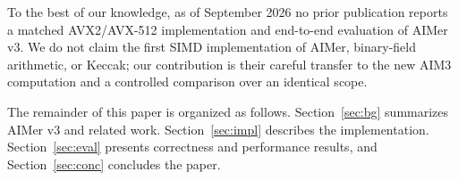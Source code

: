To the best of our knowledge, as of September 2026 no prior publication
reports a matched AVX2/AVX-512 implementation and end-to-end evaluation of
AIMer v3.  We do not claim the first SIMD implementation of AIMer, binary-field
arithmetic, or Keccak; our contribution is their careful transfer to the new
AIM3 computation and a controlled comparison over an identical scope.

The remainder of this paper is organized as follows.  Section~\ref{sec:bg}
summarizes AIMer v3 and related work.  Section~\ref{sec:impl} describes the
implementation.  Section~\ref{sec:eval} presents correctness and performance
results, and Section~\ref{sec:conc} concludes the paper.
